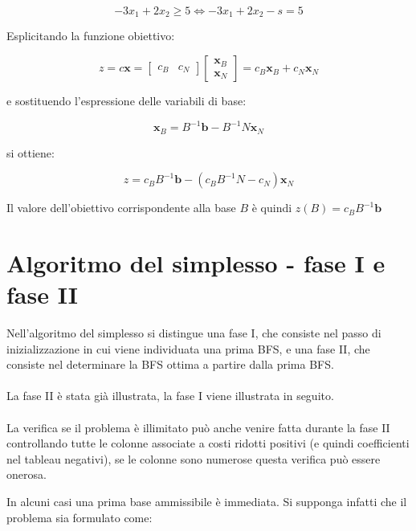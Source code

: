 \documentclass[a4paper, 11pt]{article}
\begin{document}
        \[
            -3x_1+2x_2 \geq 5 \Leftrightarrow -3x_1+2x_2 - s = 5 
        \]

        Esplicitando la funzione obiettivo:

        $$
            z = c\mathbf{x} = \begin{bmatrix} c_B & c_N \end{bmatrix} \begin{bmatrix} \mathbf{x}_B \\ \mathbf{x}_N \end{bmatrix} = c_B\mathbf{x}_B + c_N\mathbf{x}_N
        $$

        e sostituendo l'espressione delle variabili di base:

        $$
            \mathbf{x}_B = B^{-1}\mathbf{b} - B^{-1}N\mathbf{x}_N
        $$

        si ottiene:

        $$
            z = c_BB^{-1}\mathbf{b} - (c_BB^{-1}N - c_N)\mathbf{x}_N
        $$

        Il valore dell'obiettivo corrispondente alla base $B$ è quindi $z(B) = c_BB^{-1}\mathbf{b}$


            
    \section{Algoritmo del simplesso - fase I e fase II}
        Nell’algoritmo del simplesso si distingue una fase I, che consiste nel passo di inizializzazione in cui viene individuata una prima BFS, e una fase II, che consiste nel determinare la BFS ottima a partire dalla prima BFS.

        \paragraph{}
        La fase II è stata già illustrata, la fase I viene illustrata in seguito.

        \paragraph{}
        La verifica se il problema è illimitato può anche venire fatta durante la fase II controllando tutte le colonne associate a costi ridotti positivi (e quindi coefficienti nel tableau negativi), se le
        colonne sono numerose questa verifica può essere onerosa.

        In alcuni casi una prima base ammissibile è immediata. Si supponga infatti che il problema sia
        formulato come:
\end{document}
